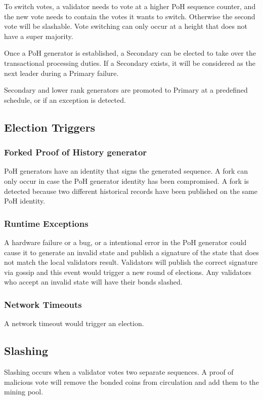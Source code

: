 \documentclass[12pt]{article}
\begin{document}
To switch votes, a validator needs to vote at a higher PoH sequence counter, and the new vote needs to contain the votes it wants to switch. Otherwise the second vote will be slashable. Vote switching can only occur at a height that does not have a super majority.

Once a PoH generator is established, a Secondary can be elected to take over the transactional processing duties. If a Secondary exists, it will be considered as the next leader during a Primary failure.

Secondary and lower rank generators are promoted to Primary at a predefined schedule, or if an exception is detected.
\subsection{Election Triggers}
\subsubsection{Forked Proof of History generator}

PoH generators have an identity that signs the generated sequence. A fork can only occur in case the PoH generator identity has been compromised. A fork is detected because two different historical records have been published on the same PoH identity.

\subsubsection{Runtime Exceptions}
A hardware failure or a bug, or a intentional error in the PoH generator could cause it to generate an invalid state and publish a signature of the state that does not match the local validators result. Validators will publish the correct signature via gossip and this event would trigger a new round of elections. Any validators who accept an invalid state will have their bonds slashed.

\subsubsection{Network Timeouts}

A network timeout would trigger an election.

\subsection{Slashing}
Slashing occurs when a validator votes two separate sequences. A proof of malicious vote will remove the bonded coins from circulation and add them to the mining pool.
\end{document}
